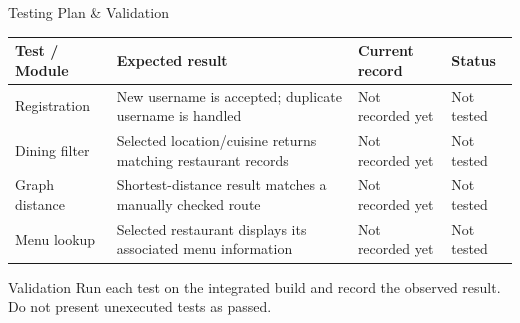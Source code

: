 \documentclass[aspectratio=169,10pt]{beamer}
\begin{document}
\begin{frame}{Testing Plan \& Validation}
\scriptsize
\begin{center}
\renewcommand{\arraystretch}{1.35}
\begin{tabularx}{.96\textwidth}{@{}p{2.2cm}X X p{1.3cm}@{}}
\toprule
Test / Module & Expected result & Current record & Status\\
\midrule
Registration & New username is accepted; duplicate username is handled & Not recorded yet & Not tested\\
Dining filter & Selected location/cuisine returns matching restaurant records & Not recorded yet & Not tested\\
Graph distance & Shortest-distance result matches a manually checked route & Not recorded yet & Not tested\\
Menu lookup & Selected restaurant displays its associated menu information & Not recorded yet & Not tested\\
\bottomrule
\end{tabularx}
\end{center}
\vspace{3mm}
\begin{block}{Validation}
Run each test on the integrated build and record the observed result. Do not present unexecuted tests as passed.
\end{block}
\end{frame}
\end{document}
